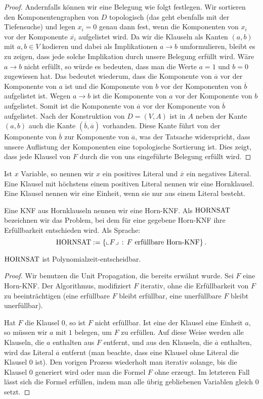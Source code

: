 \begin{proof}
	Andernfalls können wir eine Belegung wie folgt festlegen.  Wir sortieren den Komponentengraphen von $D$  topologisch (das geht ebenfalls mit der Tiefensuche) und legen $x_i=0$ genau dann fest, wenn die Komponenten von $x_i$ vor der Komponente $\overline{x_i}$ aufgelistet wird. Da wir die Klauseln als Kanten $(a,b)$ mit $a,b \in V$ kodieren und dabei als Implikationen $a \to b$ umformulieren, bleibt es zu zeigen, dass jede solche Implikation durch unsere Belegung erfüllt wird. Wäre $a \to b$ nicht erfüllt, so würde es bedeuten, dass man die Werte $a=1$ und $b=0$ zugewiesen hat. Das bedeutet wiederum, dass die Komponente von $\overline{a}$ vor der Komponente von $a$ ist und die Komponente von $b$ vor der Komponenten von $\overline{b}$ aufgelistet ist. Wegen $ a \to b$ ist die Komponente von $a$ vor der Komponente von $b$ aufgelistet. Somit ist die Komponente von $\overline{a}$ vor der Komponente von $\overline{b}$ aufgelistet. Nach der Konstruktion von $D=(V,A)$ ist in $A$ neben der Kante $(a,b)$ auch die Kante $(\overline{b},\overline{a})$ vorhanden. Diese Kante führt von der Komponente von $\overline{b}$ zur Komponente von $\overline{a}$, was der Tatsache widerspricht, dass unsere Auflistung der  Komponenten eine topologische Sortierung ist. Dies zeigt, dass jede Klausel von $F$ durch die von uns eingeführte Belegung erfüllt wird. 
\end{proof} 

\begin{defn}
	Ist $x$ Variable, so nennen wir $x$ ein positives Literal und $\overline{x}$ ein negatives Literal. Eine Klausel mit höchstens einem positiven Literal nennen wir eine Hornklausel. Eine Klausel nennen wir eine Einheit, wenn sie nur aus einem Literal besteht. 
	
	Eine KNF aus Hornklauseln nennen wir eine Horn-KNF. Als  $\operatorname{HORNSAT}$ bezeichnen wir das Problem, bei dem für eine gegebene Horn-KNF ihre Erfüllbarkeit entschieden wird. Als Sprache: 
	\[
		\HORNSAT := \setcond{\enc{F} }{F \ \text{erfüllbare Horn-KNF}}. 
	\]
\end{defn} 

\begin{thm}
	$\operatorname{HORNSAT}$ ist Polynomialzeit-entscheidbar. 
\end{thm} 
\begin{proof}
	Wir benutzen die Unit Propagation, die bereits erwähnt wurde. Sei $F$ eine Horn-KNF. Der Algorithmus, modifiziert $F$ iterativ, ohne die Erfüllbarkeit von $F$ zu beeinträchtigen (eine erfüllbare $F$ bleibt erfüllbar,  eine unerfüllbare $F$ bleibt unerfüllbar). 
	
	Hat $F$ die Klausel $0$, so ist $F$ nicht erfüllbar.  Ist eine der Klausel eine Einheit $a$, so müssen wir $a$ mit $1$ belegen, um $F$ zu erfüllen. Auf diese Weise werden alle Klauseln, die $a$ enthalten aus $F$ entfernt, und aus den Klauseln, die $\overline{a}$ enthalten, wird das Literal $\overline{a}$ entfernt (man beachte, dass eine Klausel ohne Literal die Klausel $0$ ist). Den vorigen Prozess wiederholt man iterativ  solange, bis die Klausel $0$ generiert wird oder man die Formel $F$ ohne erzeugt. Im letzteren Fall lässt sich die Formel erfüllen, indem man alle übrig gebliebenen Variablen gleich $0$ setzt. 
\end{proof} 


